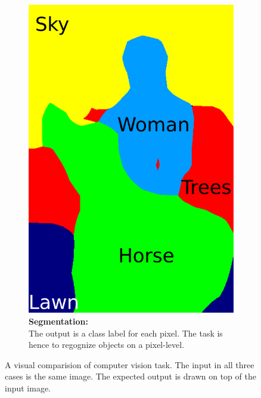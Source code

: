 \begin{figure}
\begin{subfigure}[t]{0.32\columnwidth}
        \includegraphics[width=\columnwidth]{figures/horse_seg.png}
        \caption{ \textbf{Segmentation:} \\
		The output is a class label for each pixel. The task is hence to regognize objects on a pixel-level.}
        \label{fig:sfig3}
    \end{subfigure}
    \caption{A visual comparision of computer vision task. The input in all three cases is the same image. The expected output is drawn on top of the input image.}
    \label{fig:cvtasks}
\end{figure}



